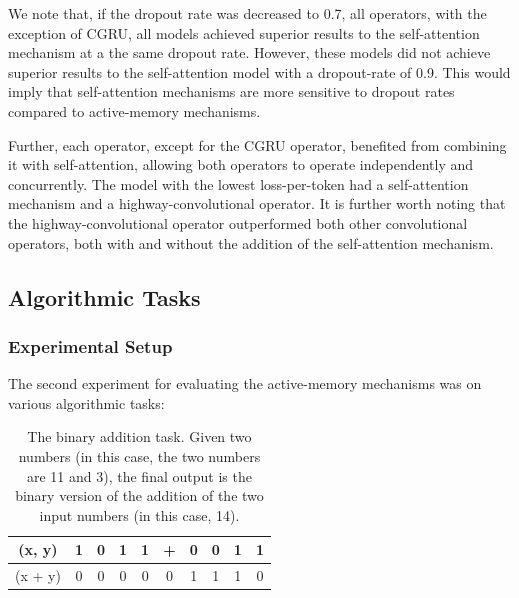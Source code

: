 \documentclass{article}
\begin{document}
We note that, if the dropout rate was decreased to 0.7, all operators, with the exception of CGRU, all models achieved superior results to the self-attention mechanism at a the same dropout rate. However, these models did not achieve superior results to the self-attention model with a dropout-rate of 0.9. This would imply that self-attention mechanisms are more sensitive to dropout rates compared to active-memory mechanisms.

Further, each operator, except for the CGRU operator, benefited from combining it with self-attention, allowing both operators to operate independently and concurrently. The model with the lowest loss-per-token had a self-attention mechanism and a highway-convolutional operator. It is further worth noting that the highway-convolutional operator outperformed both other convolutional operators, both with and without the addition of the self-attention mechanism.

\subsection{Algorithmic Tasks}

\subsubsection{Experimental Setup}
The second experiment for evaluating the active-memory mechanisms was on various algorithmic tasks:

\begin{table}[!t]
\begin{center}
    \begin{tabular}{c c c c c c c c c c}
    \hline
    (x, y) & 1 & 0 & 1 & 1 & + & 0 & 0 & 1 & 1 \\
    \hline \hline
    (x + y) & 0 & 0 & 0 & 0 & 0 & 1 & 1 & 1 & 0 \\
    \hline
    \end{tabular}
\end{center}
\caption{The binary addition task. Given two numbers (in this case, the two numbers are 11 and 3), the final output is the binary version of the addition of the two input numbers (in this case, 14). }
\end{table}
\end{document}
